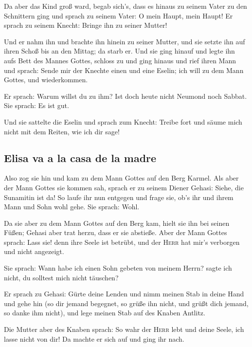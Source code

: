  Da aber das Kind groß ward, begab sich's, dass es hinaus
zu seinem Vater zu den Schnittern ging  und sprach zu
seinem Vater: O mein Haupt, mein Haupt! Er sprach zu seinem Knecht:
Bringe ihn zu seiner Mutter!

 Und er nahm ihn und brachte ihn hinein zu seiner Mutter,
und sie setzte ihn auf ihren Schoß bis an den Mittag; da starb er.
 Und sie ging hinauf und legte ihn aufs Bett des Mannes
Gottes, schloss zu und ging hinaus  und rief ihren Mann
und sprach: Sende mir der Knechte einen und eine Eselin; ich will zu dem
Mann Gottes, und wiederkommen.

 Er sprach: Warum willst du zu ihm? Ist doch heute nicht
Neumond noch Sabbat. Sie sprach: Es ist gut.

 Und sie sattelte die Eselin und sprach zum Knecht:
Treibe fort und säume mich nicht mit dem Reiten, wie ich dir sage!

\hypertarget{elisa-va-a-la-casa-de-la-madre}{%
\subsection{Elisa va a la casa de la
madre}\label{elisa-va-a-la-casa-de-la-madre}}

 Also zog sie hin und kam zu dem Mann Gottes auf den Berg
Karmel. Als aber der Mann Gottes sie kommen sah, sprach er zu seinem
Diener Gehasi: Siehe, die Sunamitin ist da!  So laufe ihr
nun entgegen und frage sie, ob's ihr und ihrem Mann und Sohn wohl gehe.
Sie sprach: Wohl.

 Da sie aber zu dem Mann Gottes auf den Berg kam, hielt
sie ihn bei seinen Füßen; Gehasi aber trat herzu, dass er sie abstieße.
Aber der Mann Gottes sprach: Lass sie! denn ihre Seele ist betrübt, und
der \textsc{Herr} hat mir's verborgen und nicht angezeigt.

 Sie sprach: Wann habe ich einen Sohn gebeten von meinem
Herrn? sagte ich nicht, du solltest mich nicht täuschen?

 Er sprach zu Gehasi: Gürte deine Lenden und nimm meinen
Stab in deine Hand und gehe hin (so dir jemand begegnet, so grüße ihn
nicht, und grüßt dich jemand, so danke ihm nicht), und lege meinen Stab
auf des Knaben Antlitz.

 Die Mutter aber des Knaben sprach: So wahr der
\textsc{Herr} lebt und deine Seele, ich lasse nicht von dir! Da machte
er sich auf und ging ihr nach.

